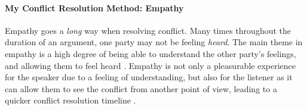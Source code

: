 \documentclass[stu,12pt]{apa7}
\begin{document}
      \paragraph{My Conflict Resolution Method: Empathy}
        Empathy goes a \textit{long} way when resolving conflict. Many times
          throughout the duration of an argument, one party may not be feeling
          \emph{heard}. The main theme in empathy is a high degree of being
          able to understand the other party's feelings, and allowing them to
          feel heard \parencite[pp. 48]{wied_empathy_2007}. Empathy is not only
          a pleasurable experience for the speaker due to a feeling of
          understanding, but also for the listener as it can allow them to
          see the conflict from another point of view, leading to a quicker
          conflict resolution timeline \parencite[pp. 49]{wied_empathy_2007}.




  \newpage
  \nocite{*}
  \printbibliography[%
    title={Works Consulted},%
    heading={bibintoc},%
    category={consulted}%
  ]
\end{document}
